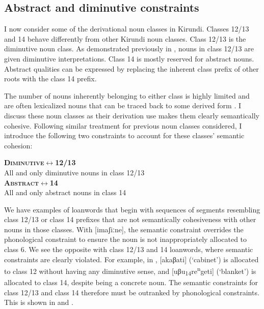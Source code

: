 \documentclass[output=paper,colorlinks,citecolor=brown,
]{langscibook}
\begin{document}
\subsection{Abstract and diminutive constraints} \label{sec:kinchsular:absdimconstraints} 

 I now consider some of the derivational noun classes in Kirundi. Classes 12/13 and 14 behave differently from other Kirundi noun classes. Class 12/13 is the diminutive noun class. As demonstrated previously in , nouns in class 12/13 are given diminutive interpretations. Class 14 is mostly reserved for abstract nouns. Abstract qualities can be expressed by replacing the inherent class prefix of other roots with the class 14 prefix. \par
The number of nouns inherently belonging to either class is highly limited and are often lexicalized nouns that can be traced back to some derived form \citep{zorc2007kinyarwanda}. I discuss these noun classes as their derivation use makes them clearly semantically cohesive. Following similar treatment for previous noun classes considered, I introduce the following two constraints to account for these classes’ semantic cohesion:

\begin{exe}
     \ex \textbf{\textsc{Diminutive{$\leftrightarrow$}{12/13}}} \\
        All and only diminutive nouns in class 12/13 \\ 
        \ex \textbf{\textsc{Abstract{$\leftrightarrow$}{14}}} \\
        All and only abstract nouns in class 14
\end{exe}

We have examples of loanwords that begin with sequences of segments resembling class 12/13 or class 14 prefixes that are not semantically cohesiveness with other nouns in those classes. With [imaʃiːne], the semantic constraint overrides the phonological constraint to ensure the noun is not inappropriately allocated to class 6. We see the opposite with class 12/13 and 14 loanwords, where semantic constraints are clearly violated. For example, in , [akaβati] (‘cabinet’) is allocated to class 12 without having any diminutive sense, and [uβu\textsubscript{14}re\textsuperscript{n}geti] (‘blanket’) is allocated to class 14, despite being a concrete noun. The semantic constraints for class 12/13 and class 14 therefore must be outranked by phonological constraints. This is shown in  and .
\end{document}
